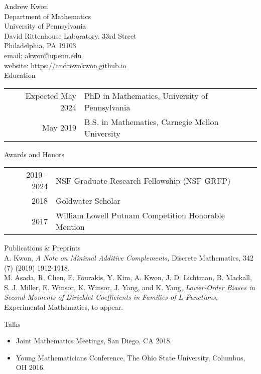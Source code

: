 \documentclass{article}
\begin{document}
\LARGE{Andrew Kwon}\vspace{0.0in}\\

\normalsize
Department of Mathematics\\
University of Pennsylvania\\
David Rittenhouse Laboratory, 33rd Street\\
Philadelphia, PA 19103\\

email: \href{mailto:akwon@upenn.edu}{akwon@upenn.edu}\\
website: \url{https://andrewokwon.github.io}\vspace{0.25in}\\

\Large{Education}\vspace{0.2in}\\
\normalsize
\begin{tabular}{r l}
	Expected May 2024 & PhD in Mathematics, University of Pennsylvania\\
	May 2019 & B.S. in Mathematics, Carnegie Mellon University
\end{tabular}
\vspace{0.25in}

\Large{Awards and Honors}\vspace{0.2in}\\
\normalsize
\begin{tabular}{r l}
	2019 - 2024 & NSF Graduate Research Fellowship (NSF GRFP)\\
	2018 & Goldwater Scholar\\
	2017 & William Lowell Putnam Competition Honorable Mention
\end{tabular}
\vspace{0.25in}

\Large{Publications \& Preprints}\vspace{0.2in}\\
\normalsize
A. Kwon, \textit{A Note on Minimal Additive Complements,} Discrete Mathematics, 342 (7) (2019) 1912-1918.\\

M. Asada, R. Chen, E. Fourakis, Y. Kim, A. Kwon, J. D. Lichtman, B. Mackall, S. J. Miller, E. Winsor, K. Winsor, J. Yang, and K. Yang, \textit{Lower-Order Biases in Second Moments of Dirichlet Coefficients in Families of $L$-Functions,} Experimental Mathematics, to appear.

\vspace{0.25in}
\Large{Talks}\\
\normalsize
\begin{itemize}
	\item Joint Mathematics Meetings, San Diego, CA 2018. 
	\item Young Mathematicians Conference, The Ohio State University, Columbus, OH 2016.
\end{itemize}
\end{document}
